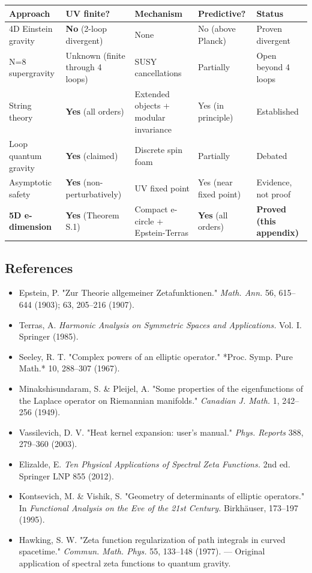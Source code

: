 \documentclass[aps,prd,preprint,superscriptaddress,longbibliography,floatfix]{revtex4-2}
\theoremstyle{remark}
\begin{document}
\begin{table}[H]
\begin{ruledtabular}
\begin{tabular}{p{3.0cm}p{3.0cm}p{3.0cm}p{3.0cm}p{3.0cm}}
Approach & UV finite? & Mechanism & Predictive? & Status \\
\hline
4D Einstein gravity & \textbf{No} (2-loop divergent) & None & No (above Planck) & Proven divergent \\
N=8 supergravity & Unknown (finite through 4 loops) & SUSY cancellations & Partially & Open beyond 4 loops \\
String theory & \textbf{Yes} (all orders) & Extended objects + modular invariance & Yes (in principle) & Established \\
Loop quantum gravity & \textbf{Yes} (claimed) & Discrete spin foam & Partially & Debated \\
Asymptotic safety & \textbf{Yes} (non-perturbatively) & UV fixed point & Yes (near fixed point) & Evidence, not proof \\
\textbf{5D e-dimension} & \textbf{Yes} (Theorem S.1) & Compact e-circle + Epstein-Terras & \textbf{Yes} (all orders) & \textbf{Proved (this appendix)} \\
\end{tabular}
\end{ruledtabular}
\end{table}



\subsection{References}


\begin{itemize}
  \item Epstein, P. "Zur Theorie allgemeiner Zetafunktionen." \textit{Math. Ann.} 56, 615--644 (1903); 63, 205--216 (1907).
  \item Terras, A. \textit{Harmonic Analysis on Symmetric Spaces and Applications.} Vol. I. Springer (1985).
  \item Seeley, R. T. "Complex powers of an elliptic operator." *Proc. Symp. Pure Math.* 10, 288--307 (1967).
  \item Minakshisundaram, S. \& Pleijel, A. "Some properties of the eigenfunctions of the Laplace operator on Riemannian manifolds." \textit{Canadian J. Math.} 1, 242--256 (1949).
  \item Vassilevich, D. V. "Heat kernel expansion: user's manual." \textit{Phys. Reports} 388, 279--360 (2003).
  \item Elizalde, E. \textit{Ten Physical Applications of Spectral Zeta Functions.} 2nd ed. Springer LNP 855 (2012).
  \item Kontsevich, M. \& Vishik, S. "Geometry of determinants of elliptic operators." In \textit{Functional Analysis on the Eve of the 21st Century.} Birkh\"{a}user, 173--197 (1995).
  \item Hawking, S. W. "Zeta function regularization of path integrals in curved spacetime." \textit{Commun. Math. Phys.} 55, 133--148 (1977). --- Original application of spectral zeta functions to quantum gravity.
\end{itemize}
\end{document}
